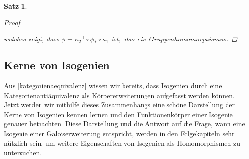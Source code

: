 \documentclass[english, german, parskip=half]{scrartcl}
\newtheorem{Satz}{Satz}[section]
\theoremstyle{definition}
\theoremstyle{remark}
\DeclareMathOperator{\Pic}{Pic} %
\begin{document}
\begin{Satz}
\begin{proof}
\begin{center}
    \end{center}
    welches zeigt, dass $\phi=\kappa_2^{-1}\circ\phi_*\circ\kappa_1$
    ist, also ein Gruppenhomomorphismus.
  \end{proof}
\end{Satz}


\subsection[Kerne]{Kerne von Isogenien}
Aus \autoref{kategorienaequivalenz} wissen wir bereits, dass Isogenien
durch eine Kategorienantiäquivalenz als Körpererweiterungen aufgefasst
werden können. 
Jetzt werden wir mithilfe dieses Zusammenhangs eine schöne Darstellung
der Kerne von Isogenien kennen lernen und den Funktionenkörper einer
Isogenie genauer betrachten.
Diese Darstellung und die Antwort auf die Frage, wann eine Isogenie einer
Galoiserweiterung entspricht, werden in den Folgekapiteln sehr
nützlich sein, um weitere Eigenschaften von Isogenien als
Homomorphismen zu untersuchen. 
\end{document}
